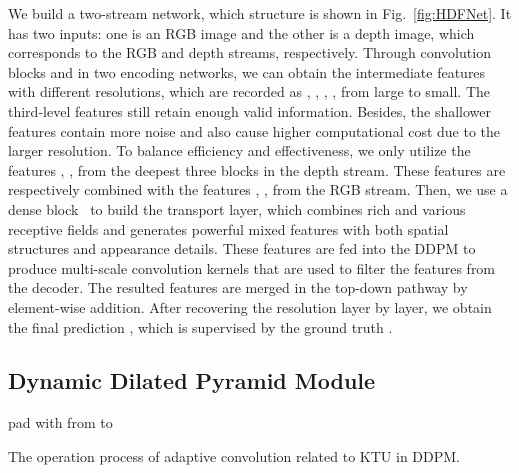 \documentclass[runningheads]{llncs}
\begin{document}
We build a two-stream network, which structure is shown in Fig.~\ref{fig:HDFNet}. It has two inputs: one is an RGB image and the other is a depth image, which corresponds to the RGB and depth streams, respectively.
Through convolution blocks  and  in two encoding networks, we can obtain the intermediate features with different resolutions, which are recorded as , , , ,  from large to small.
The third-level features still retain enough valid information. Besides, the shallower features contain more noise and also cause higher computational cost due to the larger resolution.
To balance efficiency and effectiveness, we only utilize the features , ,  from the deepest three blocks in the depth stream. These features are respectively combined with the features , ,  from the RGB stream.
Then, we use a dense block~\cite{DenseNet} to build the transport layer, which combines rich and various receptive fields and generates powerful mixed features  with both spatial structures and appearance details.
These features are fed into the DDPM to produce multi-scale convolution kernels that are used to filter the features  from the decoder. The resulted features  are merged in the top-down pathway by element-wise addition. After recovering the resolution layer by layer, we obtain the final prediction , which is supervised by the ground truth .

\subsection{Dynamic Dilated Pyramid Module}

\begin{algorithm}[t]
\KwIn{,   }
 \;
 pad  with  from  to \;
 \For{ \KwTo }{
 \For{ \KwTo }{
 \For{ \KwTo }{
 \For{ \KwTo }{
  
 
 \;
 }
 }
 }
 }
 \caption{The operation process of adaptive convolution  related to KTU in DDPM.}
 \label{alg:conv}
\end{algorithm}
\end{document}
